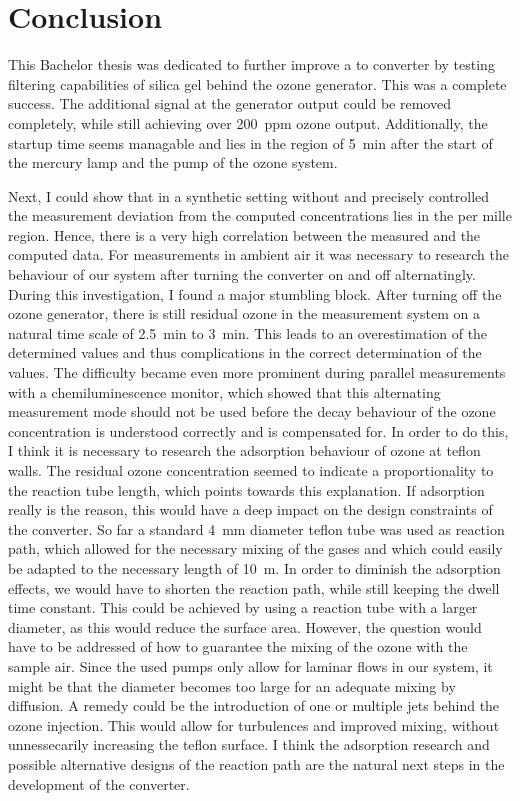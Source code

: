\section{Conclusion}
\label{sec:conclusion}

This Bachelor thesis was dedicated to further improve a  to
 converter by testing filtering capabilities of silica gel
behind the ozone generator. This was a complete success. The
additional  signal at the generator output could be removed
completely, while still achieving over \SI{200}{ppm} ozone
output. Additionally, the startup time seems managable and lies in the
region of \SI{5}{\minute} after the start of the mercury lamp and the
pump of the ozone system. 

Next, I could show that in a synthetic setting without  and
precisely controlled  the measurement deviation from the
computed  concentrations lies in the per mille region. Hence,
there is a very high correlation between the measured and the computed
data. For measurements in ambient air it was necessary to research the
behaviour of our system after turning the converter on and off
alternatingly. During this investigation, I found a major stumbling
block. After turning off the ozone generator, there is still residual
ozone in the measurement system on a natural time scale of
\SI{2.5}{\minute} to \SI{3}{\minute}. This leads to an overestimation
of the determined  values and thus complications in the
correct determination of the  values. The difficulty became
even more prominent during parallel measurements with a
chemiluminescence monitor, which showed that this alternating
measurement mode should not be used before the decay behaviour of the
ozone concentration is understood correctly and is compensated for. In
order to do this, I think it is necessary to research the adsorption
behaviour of ozone at teflon walls. The residual ozone concentration
seemed to indicate a proportionality to the reaction tube length,
which points towards this explanation. If adsorption really is the
reason, this would have a deep impact on the design constraints of the
converter. So far a standard \SI{4}{\milli\meter} diameter teflon tube
was used as reaction path, which allowed for the necessary mixing of
the gases and which could easily be adapted to the necessary length of
\SI{10}{\meter}. In order to diminish the adsorption effects, we would
have to shorten the reaction path, while still keeping the dwell time
constant. This could be achieved by using a reaction tube with a
larger diameter, as this would reduce the surface area. However, the
question would have to be addressed of how to guarantee the mixing of
the ozone with the sample air. Since the used pumps only allow for
laminar flows in our system, it might be that the diameter becomes too
large for an adequate mixing by diffusion. A remedy could be the
introduction of one or multiple jets behind the ozone injection. This
would allow for turbulences and improved mixing, without unnessecarily
increasing the teflon surface. I think the adsorption research and
possible alternative designs of the reaction path are the natural next
steps in the development of the converter.

